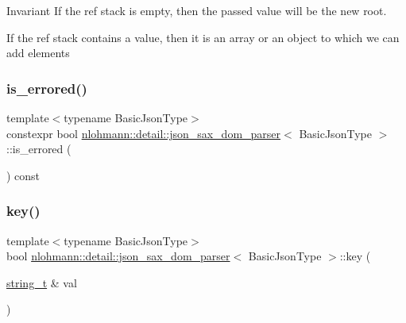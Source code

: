 \begin{DoxyInvariant}{Invariant}
If the ref stack is empty, then the passed value will be the new root. 

If the ref stack contains a value, then it is an array or an object to which we can add elements 
\end{DoxyInvariant}
\mbox{\label{classnlohmann_1_1detail_1_1json__sax__dom__parser_ad1b9f3681fadbbb2e0127f5c8a99c662}} 
\subsubsection{\texorpdfstring{is\+\_\+errored()}{is\_errored()}}
{\footnotesize\ttfamily template$<$typename Basic\+Json\+Type$>$ \\
constexpr bool \hyperlink{classnlohmann_1_1detail_1_1json__sax__dom__parser}{nlohmann\+::detail\+::json\+\_\+sax\+\_\+dom\+\_\+parser}$<$ Basic\+Json\+Type $>$\+::is\+\_\+errored (\begin{DoxyParamCaption}{ }\end{DoxyParamCaption}) const\hspace{0.3cm}{\ttfamily [inline]}}

\mbox{\label{classnlohmann_1_1detail_1_1json__sax__dom__parser_ad427febda4997cbd8345a2596af66649}} 
\subsubsection{\texorpdfstring{key()}{key()}}
{\footnotesize\ttfamily template$<$typename Basic\+Json\+Type$>$ \\
bool \hyperlink{classnlohmann_1_1detail_1_1json__sax__dom__parser}{nlohmann\+::detail\+::json\+\_\+sax\+\_\+dom\+\_\+parser}$<$ Basic\+Json\+Type $>$\+::key (\begin{DoxyParamCaption}\item[{\hyperlink{classnlohmann_1_1detail_1_1json__sax__dom__parser_afd4d961ab2a6b01cbe6e840f7fb90cdc}{string\+\_\+t} \&}]{val }\end{DoxyParamCaption})\hspace{0.3cm}{\ttfamily [inline]}}

